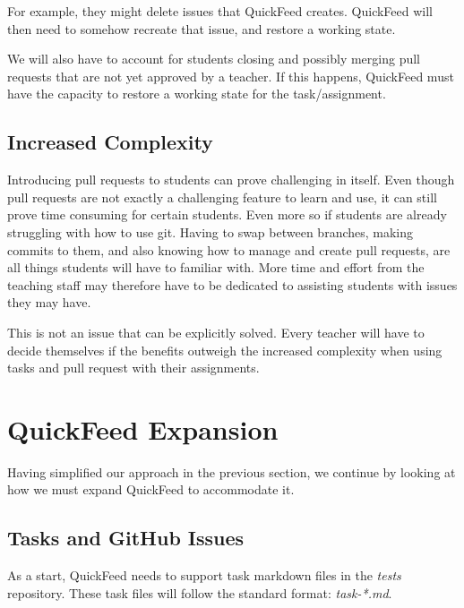 For example, they might delete issues that QuickFeed creates.
QuickFeed will then need to somehow recreate that issue, and restore a working state.

We will also have to account for students closing and possibly merging pull requests that are not yet approved by a teacher.
If this happens, QuickFeed must have the capacity to restore a working state for the task/assignment.

\subsection{Increased Complexity}

Introducing pull requests to students can prove challenging in itself.
Even though pull requests are not exactly a challenging feature to learn and use, it can still prove time consuming for certain students.
Even more so if students are already struggling with how to use git.
Having to swap between branches, making commits to them, and also knowing how to manage and create pull requests, are all things students will have to familiar with.
More time and effort from the teaching staff may therefore have to be dedicated to assisting students with issues they may have.

This is not an issue that can be explicitly solved.
Every teacher will have to decide themselves if the benefits outweigh the increased complexity when using tasks and pull request with their assignments.

\section{QuickFeed Expansion}
Having simplified our approach in the previous section, we continue by looking at how we must expand QuickFeed to accommodate it.

\subsection{Tasks and GitHub Issues}
\label{sec:tasks_and_github_issues}

As a start, QuickFeed needs to support task markdown files in the \textit{tests} repository.
These task files will follow the standard format: \textit{task-*.md}.

